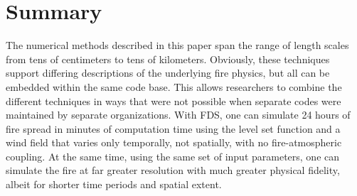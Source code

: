\documentclass[journal,article,atmosphere,submit,moreauthors,pdftex]{Definitions/mdpi}
\begin{document}
\section{Summary} \label{sec:summary}

The numerical methods described in this paper span the range of length scales from tens of centimeters to tens of kilometers. Obviously, these techniques support differing descriptions of the underlying fire physics, but all can be embedded within the same code base. This allows researchers to combine the different techniques in ways that were not possible when separate codes were maintained by separate organizations. With FDS, one can simulate 24 hours of fire spread in minutes of computation time using the level set function and a wind field that varies only temporally, not spatially, with no fire-atmospheric coupling. At the same time, using the same set of input parameters, one can simulate the fire at far greater resolution with much greater physical fidelity, albeit for shorter time periods and spatial extent.















\end{document}
